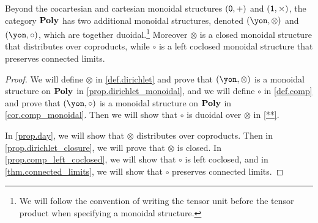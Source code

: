 \documentclass[Book-Poly]{subfiles}
\begin{document}
\begin{proposition}
Beyond the cocartesian and cartesian monoidal structures $(\textsf{0},+)$ and $(\textsf{1},\times)$, the category $\mathbf{Poly}$ has two additional monoidal structures, denoted $(\yon,\otimes)$ and $(\yon,\circ)$, which are together duoidal.\footnote{We will follow the convention of writing the tensor unit before the tensor product when specifying a monoidal structure.} Moreover $\otimes$ is a closed monoidal structure that distributes over coproducts, while $\circ$ is a left coclosed monoidal structure that preserves connected limits.
\end{proposition}
\begin{proof}
We will define $\otimes$ in \cref{def.dirichlet} and prove that $(\yon, \otimes)$ is a monoidal structure on $\mathbf{Poly}$ in \cref{prop.dirichlet_monoidal}, and we will define $\circ$ in \cref{def.comp} and prove that $(\yon, \circ)$ is a monoidal structure on $\mathbf{Poly}$ in \cref{cor.comp_monoidal}.
Then we will show that $\circ$ is duoidal over $\otimes$ in \cref{**}.

In \cref{prop.day}, we will show that $\otimes$ distributes over coproducts.
Then in \cref{prop.dirichlet_closure}, we will prove that $\otimes$ is closed.
In \cref{prop.comp_left_coclosed}, we will show that $\circ$ is left coclosed, and in \cref{thm.connected_limits}, we will show that $\circ$ preserves connected limits.
\end{proof}
\end{document}
